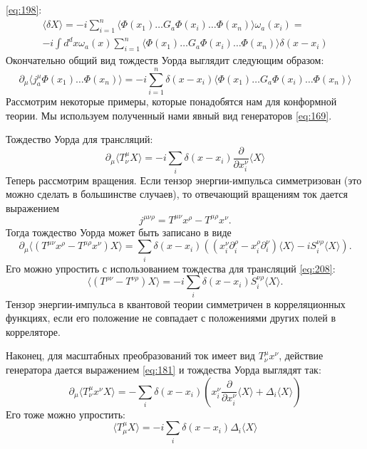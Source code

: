 \documentclass[a4paper,12pt]{article} \usepackage[utf8x]{inputenc} \usepackage[russian]{babel}
\theoremstyle{definition} \newtheorem{corollary}{Corollary}[theorem] \theoremstyle{definition}
\begin{document}
\eqref{eq:198}:
\begin{multline}
  \label{eq:206} \langle\delta X\rangle=-i\sum_{i=1}^{n}\langle \Phi(x_{1})\dots G_{a} \Phi(x_{i})
\dots \Phi(x_{n})\rangle \omega_{a}(x_{i})=\\ -i \int d^{d}x \omega_{a}(x) \sum_{i=1}^{n} \langle
\Phi(x_{1}) \dots G_{a} \Phi(x_{i}) \dots \Phi(x_{n})\rangle \delta (x-x_{i})
\end{multline} Окончательно общий вид тождеств Уорда выглядит следующим образом:
\begin{equation}
  \label{eq:207}
  \partial_{\mu}\langle j^{\mu}_{a}\Phi(x_{1}) \dots \Phi(x_{n})\rangle=-i\sum_{i=1}^{n}\delta
(x-x_{i}) \langle\Phi(x_{1})\dots G_{a} \Phi(x_{i})\dots \Phi(x_{n})\rangle
\end{equation} Рассмотрим некоторые примеры, которые понадобятся нам для конформной теории. Мы
используем полученный нами явный вид генераторов \eqref{eq:169}.

Тождество Уорда для трансляций:
\begin{equation}
  \label{eq:208}
  \partial_{\mu}\langle T^{\mu}_{\nu} X\rangle =-i \sum_{i} \delta(x-x_{i}) \frac{\partial}{\partial
x_{i}^{\nu}} \langle X \rangle
\end{equation} Теперь рассмотрим вращения. Если тензор энергии-импульса симметризован (это можно
сделать в большинстве случаев), то отвечающий вращениям ток дается выражением
\begin{equation}
  \label{eq:209} j^{\mu\nu\rho}=T^{\mu\nu}x^{\rho}-T^{\mu\rho}x^{\nu}.
\end{equation} Тогда тождество Уорда может быть записано в виде
\begin{equation}
  \label{eq:210}
  \partial_{\mu}\langle (T^{\mu\nu}x^{\rho}-T^{\mu\rho}x^{\nu}) X\rangle=\sum_{i }\delta(x-x_{i})
\left( (x^{\nu}_{i}\partial^{\rho}_{i}-x^{\rho}_{i}\partial^{\nu}_{i})\langle X\rangle-i
S^{\nu\rho}_{i}\langle X\rangle\right).
\end{equation} Его можно упростить с использованием тождества для трансляций \eqref{eq:208}:
\begin{equation}
  \label{eq:211} \langle (T^{\rho\nu}-T^{\nu\rho}) X\rangle=-i \sum_{i} \delta(x-x_{i})
S^{\nu\rho}_{i}\langle X\rangle.
\end{equation} Тензор энергии-импульса в квантовой теории симметричен в корреляционных функциях,
если его положение не совпадает с положениями других полей в корреляторе.

Наконец, для масштабных преобразований ток имеет вид $T^{\mu}_{\nu}x^{\nu}$, действие генератора
дается выражением \eqref{eq:181} и тождества Уорда выглядят так:
\begin{equation}
  \label{eq:212}
  \partial_{\mu}\langle T^{\mu}_{\nu} x^{\nu} X\rangle=-\sum_{i} \delta(x-x_{i}) \left(
x^{\nu}_{i}\frac{\partial}{\partial x^{\nu}_{i}} \langle X\rangle+\Delta_{i} \langle X\rangle\right)
\end{equation} Его тоже можно упростить:
\begin{equation}
  \label{eq:213} \langle T^{\mu}_{\mu} X \rangle = -i \sum_{i} \delta(x-x_{i}) \Delta_{i}\langle
X\rangle
\end{equation}
\end{document}
